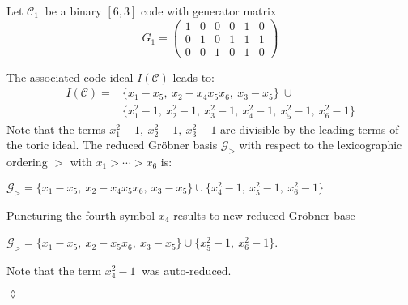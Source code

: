 \begin{env_example} \normalfont
 Let $\mathcal{C}_{1}~$ be a binary $[6,3]$ code with generator matrix
\[
G_{1} =
\begin{pmatrix}
1 & 0 & 0 & 0 & 1 & 0 \\ 
0 & 1 & 0 & 1 & 1 & 1 \\  
0 & 0 & 1 & 0 & 1 & 0  
\end{pmatrix} 
\]

The associated code ideal $I(\mathcal{C})$ leads to: \newline
\begin{align*}
I(\mathcal{C}) = &\{x_{1}-x_{5},~x_{2}-x_{4}x_{5}x_{6},~x_{3}-x_{5}  \} ~\cup \\ &\{x_{1}^{2}-1,~x_{2}^{2}-1,~x_{3}^{2}-1,~x_{4}^{2}-1,~x_{5}^{2}-1,~x_{6}^{2}-1\}
\end{align*}
Note that the terms $x_{1}^{2}-1,~x_{2}^{2}-1,~x_{3}^{2}-1 $ are divisible by the leading terms of the toric ideal.
The reduced Gröbner basis $\mathcal{G}_{>}$ with respect to the lexicographic ordering $>$ with $x_{1} > \cdots > x_{6}$ is:
\begin{center}
$ \mathcal{G}_{>} = \{x_{1}-x_{5},~x_{2}-x_{4}x_{5}x_{6},~x_{3}-x_{5}  \} \cup \{x_{4}^{2}-1,~x_{5}^{2}-1,~x_{6}^{2}-1  \}  $
\end{center}

Puncturing the fourth symbol $x_4$ results to new reduced Gröbner base 
\begin{center}
$ \mathcal{G}_{>} = \{x_{1}-x_{5},~x_{2}-x_{5}x_{6},~x_{3}-x_{5}  \} \cup \{x_{5}^{2}-1,~x_{6}^{2}-1  \}  $.
\end{center}
Note that the term $x_{4}^{2}-1~$ was auto-reduced.


\begin{flushright}
$\lozenge$
\end{flushright} 

\end{env_example}

 

\newpage